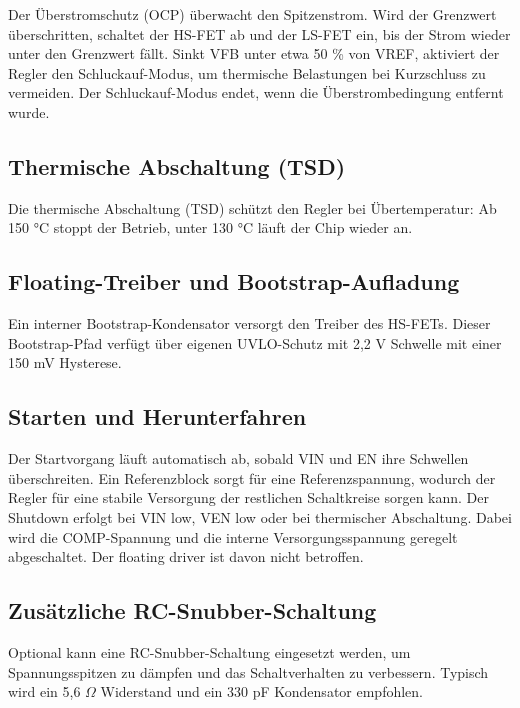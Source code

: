 Der Überstromschutz (OCP) überwacht den Spitzenstrom. Wird der Grenzwert überschritten, schaltet der HS-FET ab und der LS-FET ein, bis der Strom wieder unter den Grenzwert fällt. Sinkt VFB unter etwa 50 \% von VREF, aktiviert der Regler den Schluckauf-Modus, um thermische Belastungen bei Kurzschluss zu vermeiden. Der Schluckauf-Modus endet, wenn die Überstrombedingung entfernt wurde. \cite{MPS:2015}

\subsection{Thermische Abschaltung (TSD)}

Die thermische Abschaltung (TSD) schützt den Regler bei Übertemperatur: Ab 150 °C stoppt der Betrieb, unter 130 °C läuft der Chip wieder an. \cite{MPS:2015}

\subsection{Floating-Treiber und Bootstrap-Aufladung}

Ein interner Bootstrap-Kondensator versorgt den Treiber des HS-FETs. Dieser Bootstrap-Pfad verfügt über eigenen UVLO-Schutz mit 2,2 V Schwelle mit einer 150 mV Hysterese. \cite{MPS:2015}

\subsection{Starten und Herunterfahren}

Der Startvorgang läuft automatisch ab, sobald VIN und EN ihre Schwellen überschreiten. Ein Referenzblock sorgt für eine Referenzspannung, wodurch der Regler für eine stabile Versorgung der restlichen Schaltkreise sorgen kann. Der Shutdown erfolgt bei VIN low, VEN low oder bei thermischer Abschaltung. Dabei wird die COMP-Spannung und die interne Versorgungsspannung geregelt abgeschaltet. Der floating driver ist davon nicht betroffen. \cite{MPS:2015}

\subsection{Zusätzliche RC-Snubber-Schaltung}

Optional kann eine RC-Snubber-Schaltung eingesetzt werden, um Spannungsspitzen zu dämpfen und das Schaltverhalten zu verbessern. Typisch wird ein 5,6 $\Omega$ Widerstand und ein 330 pF Kondensator empfohlen. \cite{MPS:2015}

